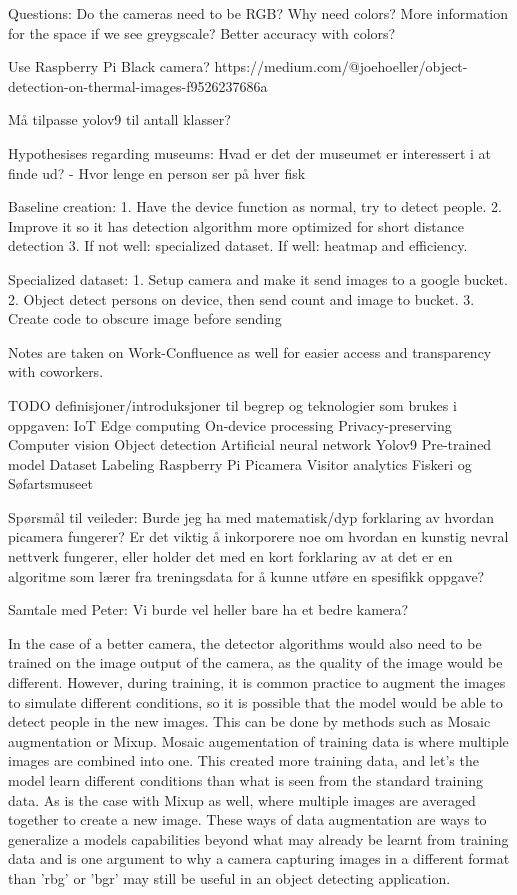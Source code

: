Questions:
Do the cameras need to be RGB? Why need colors? More information for the space if we see greygscale? Better accuracy with colors?

Use Raspberry Pi Black camera?
https://medium.com/@joehoeller/object-detection-on-thermal-images-f9526237686a

Må tilpasse yolov9 til antall klasser?


Hypothesises regarding museums:
Hvad er det der museumet er interessert i at finde ud?
    - Hvor lenge en person ser på hver fisk




Baseline creation:
1. Have the device function as normal, try to detect people. 
2. Improve it so it has detection algorithm more optimized for short distance detection
3. If not well: specialized dataset. If well: heatmap and efficiency.

Specialized dataset:
1. Setup camera and make it send images to a google bucket. 
2. Object detect persons on device, then send count and image to bucket.
3. Create code to obscure image before sending


Notes are taken on Work-Confluence as well for easier access and transparency with coworkers. 



TODO definisjoner/introduksjoner til begrep og teknologier som brukes i oppgaven:
IoT
Edge computing
    On-device processing
    Privacy-preserving
Computer vision
Object detection
    Artificial neural network
    Yolov9
    Pre-trained model
    Dataset
    Labeling
Raspberry Pi
    Picamera
Visitor analytics
    Fiskeri og Søfartsmuseet


Spørsmål til veileder:
Burde jeg ha med matematisk/dyp forklaring av hvordan picamera fungerer?
Er det viktig å inkorporere noe om hvordan en kunstig nevral nettverk fungerer, eller holder det med en kort forklaring av at det er en algoritme som lærer fra treningsdata for å kunne utføre en spesifikk oppgave?

Samtale med Peter:
Vi burde vel heller bare ha et bedre kamera?

In the case of a better camera, the detector algorithms would also need to be trained on the image output of the camera, as the quality of the image would be different. However, during training, it is common practice to augment the images to simulate different conditions, so it is possible that the model would be able to detect people in the new images. This can be done by methods such as Mosaic augmentation or Mixup. Mosaic augementation of training data is where multiple images are combined into one. This created more training data, and let's the model learn different conditions than what is seen from the standard training data. As is the case with Mixup as well, where multiple images are averaged together to create a new image. These ways of data augmentation are ways to generalize a models capabilities beyond what may already be learnt from training data and is one argument to why a camera capturing images in a different format than 'rbg' or 'bgr' may still be useful in an object detecting application.


